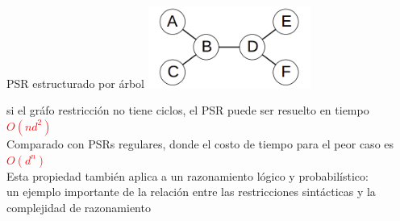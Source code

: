 \begin{frame}{PSR estructurado por \'arbol}
    \centering
    \includegraphics[width=0.4\textwidth]{34_images_CSPtree.png}\\
    \raggedright
     si el gr\'afo restricci\'on no tiene ciclos, el PSR puede ser resuelto en tiempo \textcolor{red}{$O(nd^2)$}\\
    Comparado con PSRs regulares, donde el costo de tiempo para el peor caso es \textcolor{red}{$O(d^n)$}\\
    
    Esta propiedad tambi\'en aplica a un razonamiento l\'ogico y probabil\'istico:\\
    
    un ejemplo importante de la relaci\'on entre las restricciones sint\'acticas y la complejidad de razonamiento
\end{frame}

